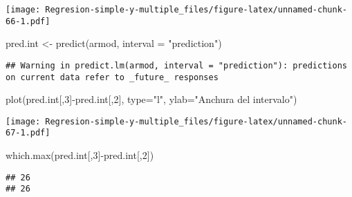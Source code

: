 \documentclass[
]{article}
\newenvironment{Shaded}{\begin{snugshade}}{\end{snugshade}}
\newcommand{\AttributeTok}[1]{\textcolor[rgb]{0.77,0.63,0.00}{#1}}
\newcommand{\DecValTok}[1]{\textcolor[rgb]{0.00,0.00,0.81}{#1}}
\newcommand{\FunctionTok}[1]{\textcolor[rgb]{0.00,0.00,0.00}{#1}}
\newcommand{\NormalTok}[1]{#1}
\newcommand{\OtherTok}[1]{\textcolor[rgb]{0.56,0.35,0.01}{#1}}
\newcommand{\SpecialCharTok}[1]{\textcolor[rgb]{0.00,0.00,0.00}{#1}}
\newcommand{\StringTok}[1]{\textcolor[rgb]{0.31,0.60,0.02}{#1}}
\begin{document}
\begin{Shaded}
\end{Shaded}

\texttt{[image: Regresion-simple-y-multiple\_files/figure-latex/unnamed-chunk-66-1.pdf]}

\begin{Shaded}
\begin{Highlighting}[]
\NormalTok{pred.int }\OtherTok{\textless{}{-}} \FunctionTok{predict}\NormalTok{(armod, }\AttributeTok{interval =} \StringTok{"prediction"}\NormalTok{)}
\end{Highlighting}
\end{Shaded}

\begin{verbatim}
## Warning in predict.lm(armod, interval = "prediction"): predictions on current data refer to _future_ responses
\end{verbatim}

\begin{Shaded}
\begin{Highlighting}[]
\FunctionTok{plot}\NormalTok{(pred.int[,}\DecValTok{3}\NormalTok{]}\SpecialCharTok{{-}}\NormalTok{pred.int[,}\DecValTok{2}\NormalTok{], }\AttributeTok{type=}\StringTok{"l"}\NormalTok{, }\AttributeTok{ylab=}\StringTok{"Anchura del intervalo"}\NormalTok{)}
\end{Highlighting}
\end{Shaded}

\texttt{[image: Regresion-simple-y-multiple\_files/figure-latex/unnamed-chunk-67-1.pdf]}

\begin{Shaded}
\begin{Highlighting}[]
\FunctionTok{which.max}\NormalTok{(pred.int[,}\DecValTok{3}\NormalTok{]}\SpecialCharTok{{-}}\NormalTok{pred.int[,}\DecValTok{2}\NormalTok{])}
\end{Highlighting}
\end{Shaded}

\begin{verbatim}
## 26 
## 26
\end{verbatim}
\end{document}

